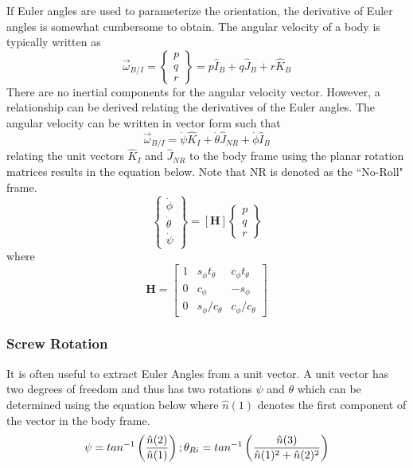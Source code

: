\documentclass{article}
\begin{document}
If Euler angles are used to parameterize the orientation, the
derivative of Euler angles is somewhat cumbersome to obtain. The angular
velocity of a body is typically written as
\begin{equation}
\vec{\omega}_{B/I} = \begin{Bmatrix} p \\ q
  \\ r \end{Bmatrix} = p \hat{I}_B + q \hat{J}_B + r \hat{K}_B
\end{equation}
There are no inertial components for the angular velocity
vector. However, a relationship can be derived relating the
derivatives of the Euler angles. The angular velocity can be written
in vector form such that
\begin{equation}
\vec{\omega}_{B/I} = \dot{\psi} \hat{K}_I + \dot{\theta} \hat{J}_{NR} +
\dot{\phi} \hat{I}_B
\end{equation}
relating the unit vectors $\hat{K}_I$ and $\hat{J}_{NR}$ to the body
frame using the planar rotation matrices results in the equation
below. Note that NR is denoted as the ``No-Roll" frame.
\begin{equation}\label{e:ptpdot}
\begin{Bmatrix} \dot{\phi} \\ \dot{\theta} \\ \dot{\psi} \end{Bmatrix}
= [\textbf{H}]
\begin{Bmatrix} p\\q\\r\end{Bmatrix}
\end{equation}
where
\begin{equation}
\textbf{H}=\begin{bmatrix} 1 & s_{\phi}t_{\theta} & c_{\phi}t_{\theta} \\ 0 &
c_{\phi} & -s_{\phi} \\ 0 & s_{\phi}/c_{\theta} &
c_{\phi}/c_{\theta} \end{bmatrix}
\end{equation}

\subsubsection{Screw Rotation}

It is often useful to extract Euler Angles from a unit vector. A unit
vector has two degrees of freedom and thus has two rotations
$\psi$ and $\theta$ which can be determined using the
equation below where $\hat{n}(1)$ denotes the first component of
the vector in the body frame. 
\begin{equation}
  \psi = tan^{-1}\left ( \frac{\hat{n}(2)}{\hat{n}(1)}
  \right) ; \\
  \theta_{Ri} = tan^{-1} \left ( \frac{\hat{n}(3)}{\hat{n}(1)^2 + \hat{n}(2)^2}
  \right)
\end{equation}
\end{document}
